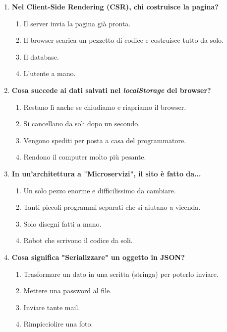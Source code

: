 \documentclass[11pt,a4paper]{article}
\begin{document}
\begin{enumerate}[label=\textbf{\arabic*.}, leftmargin=1.5em, itemsep=1.5em]
    \item \textbf{Nel Client-Side Rendering (CSR), chi costruisce la pagina?}
    \begin{enumerate}[label=\alph*)]
        \item Il server invia la pagina già pronta.
        \item Il browser scarica un pezzetto di codice e costruisce tutto da solo.
        \item Il database.
        \item L'utente a mano.
    \end{enumerate}

    \item \textbf{Cosa succede ai dati salvati nel \textit{localStorage} del browser?}
    \begin{enumerate}[label=\alph*)]
        \item Restano lì anche se chiudiamo e riapriamo il browser.
        \item Si cancellano da soli dopo un secondo.
        \item Vengono spediti per posta a casa del programmatore.
        \item Rendono il computer molto più pesante.
    \end{enumerate}

    \item \textbf{In un'architettura a "Microservizi", il sito è fatto da...}
    \begin{enumerate}[label=\alph*)]
        \item Un solo pezzo enorme e difficilissimo da cambiare.
        \item Tanti piccoli programmi separati che si aiutano a vicenda.
        \item Solo disegni fatti a mano.
        \item Robot che scrivono il codice da soli.
    \end{enumerate}

    \item \textbf{Cosa significa "Serializzare" un oggetto in JSON?}
    \begin{enumerate}[label=\alph*)]
        \item Trasformare un dato in una scritta (stringa) per poterlo inviare.
        \item Mettere una password al file.
        \item Inviare tante mail.
        \item Rimpicciolire una foto.
    \end{enumerate}


\end{enumerate}
\end{document}

